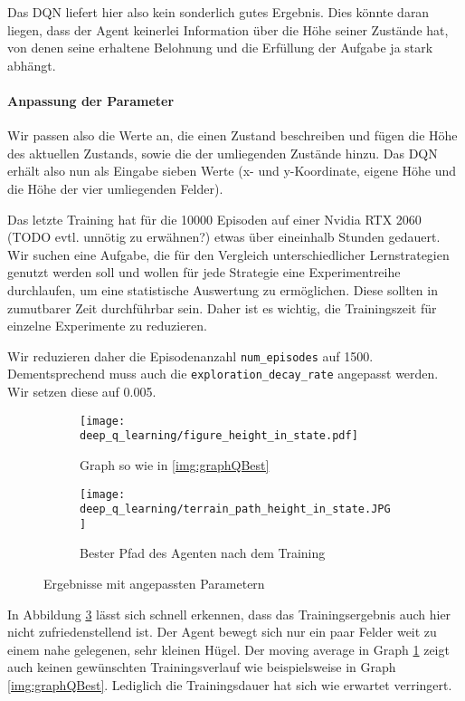 Das DQN liefert hier also kein sonderlich gutes Ergebnis. Dies könnte daran liegen, dass der Agent keinerlei Information über die Höhe seiner Zustände hat, von denen seine erhaltene Belohnung und die Erfüllung der Aufgabe ja stark abhängt.

\paragraph{Anpassung der Parameter}
 Wir passen also die Werte an, die einen Zustand beschreiben und fügen die Höhe des aktuellen Zustands, sowie die der umliegenden Zustände hinzu. Das DQN erhält also nun als Eingabe sieben Werte (x- und y-Koordinate, eigene Höhe und die Höhe der vier umliegenden Felder).

Das letzte Training hat für die 10000 Episoden auf einer Nvidia RTX 2060 (TODO evtl. unnötig zu erwähnen?) etwas über eineinhalb Stunden gedauert. Wir suchen eine Aufgabe, die für den Vergleich unterschiedlicher Lernstrategien genutzt werden soll und wollen für jede Strategie eine Experimentreihe durchlaufen, um eine statistische Auswertung zu ermöglichen. Diese sollten in zumutbarer Zeit durchführbar sein. Daher ist es wichtig, die Trainingszeit für einzelne Experimente zu reduzieren. 

Wir reduzieren daher die Episodenanzahl \texttt{num_episodes} auf 1500. Dementsprechend muss auch die \texttt{exploration_decay_rate} angepasst werden. Wir setzen diese auf 0.005.
\begin{figure}[h!]
    \centering
    \begin{subfigure}[b]{0.49\textwidth}
        \texttt{[image: deep\_q\_learning/figure\_height\_in\_state.pdf]}
        \caption{Graph so wie in \ref{img:graphQBest}}
        \label{img:graphDeepQHeightInState}
    \end{subfigure}
    \begin{subfigure}[b]{0.49\textwidth}
        \texttt{[image: deep\_q\_learning/terrain\_path\_height\_in\_state.JPG]}
        \caption{Bester Pfad des Agenten nach dem Training}
        \label{img:pathDeepQHeightInState}
    \end{subfigure}
    \caption{Ergebnisse mit angepassten Parametern}
\end{figure}
In Abbildung \ref{img:pathDeepQHeightInState} lässt sich schnell erkennen, dass das Trainingsergebnis auch hier nicht zufriedenstellend ist. Der Agent bewegt sich nur ein paar Felder weit zu einem nahe gelegenen, sehr kleinen Hügel. Der moving average in Graph \ref{img:graphDeepQHeightInState} zeigt auch keinen gewünschten Trainingsverlauf wie beispielsweise in Graph \ref{img:graphQBest}. Lediglich die Trainingsdauer hat sich wie erwartet verringert.

